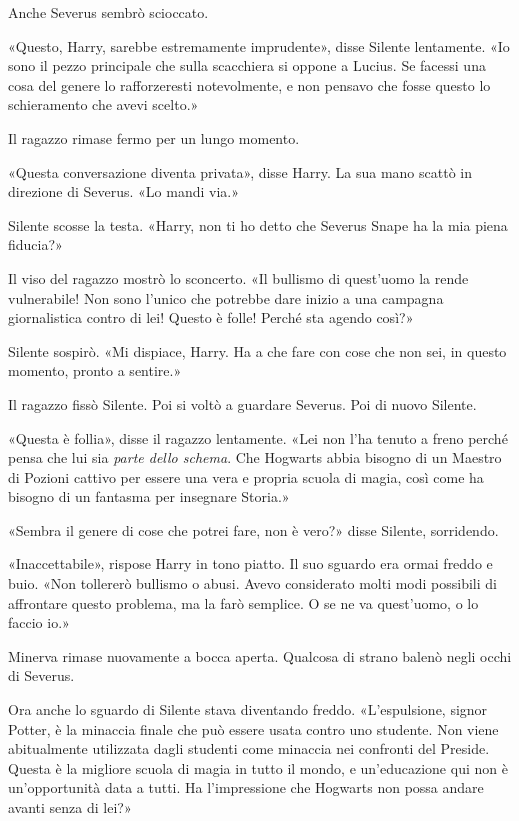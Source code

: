 Anche Severus sembrò scioccato.

«Questo, Harry, sarebbe estremamente imprudente», disse Silente lentamente. «Io sono il pezzo principale che sulla scacchiera si oppone a Lucius. Se facessi una cosa del genere lo rafforzeresti notevolmente, e non pensavo che fosse questo lo schieramento che avevi scelto.»

Il ragazzo rimase fermo per un lungo momento.

«Questa conversazione diventa privata», disse Harry. La sua mano scattò in direzione di Severus. «Lo mandi via.»

Silente scosse la testa. «Harry, non ti ho detto che Severus Snape ha la mia piena fiducia?»

Il viso del ragazzo mostrò lo sconcerto. «Il bullismo di quest’uomo la rende vulnerabile! Non sono l’unico che potrebbe dare inizio a una campagna giornalistica contro di lei! Questo è folle! Perché sta agendo così?»

Silente sospirò. «Mi dispiace, Harry. Ha a che fare con cose che non sei, in questo momento, pronto a sentire.»

Il ragazzo fissò Silente. Poi si voltò a guardare Severus. Poi di nuovo Silente.

«Questa è follia», disse il ragazzo lentamente. «Lei non l’ha tenuto a freno perché pensa che lui sia \textit{parte dello schema}. Che Hogwarts abbia bisogno di un Maestro di Pozioni cattivo per essere una vera e propria scuola di magia, così come ha bisogno di un fantasma per insegnare Storia.»

«Sembra il genere di cose che potrei fare, non è vero?» disse Silente, sorridendo.

«Inaccettabile», rispose Harry in tono piatto. Il suo sguardo era ormai freddo e buio. «Non tollererò bullismo o abusi. Avevo considerato molti modi possibili di affrontare questo problema, ma la farò semplice. O se ne va quest’uomo, o lo faccio io.»

Minerva rimase nuovamente a bocca aperta. Qualcosa di strano balenò negli occhi di Severus.

Ora anche lo sguardo di Silente stava diventando freddo. «L’espulsione, signor Potter, è la minaccia finale che può essere usata contro uno studente. Non viene abitualmente utilizzata dagli studenti come minaccia nei confronti del Preside. Questa è la migliore scuola di magia in tutto il mondo, e un’educazione qui non è un’opportunità data a tutti. Ha l’impressione che Hogwarts non possa andare avanti senza di lei?»


